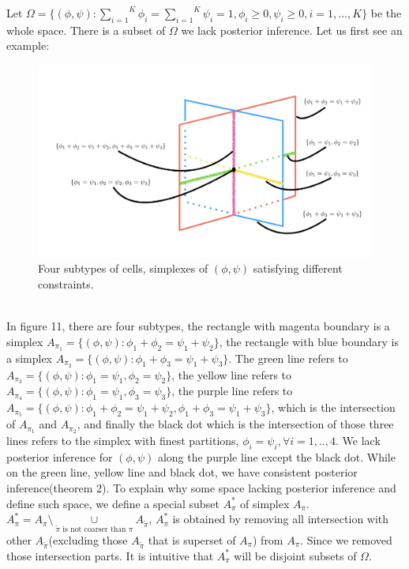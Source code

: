 \documentclass[11pt]{amsart}
\begin{document}
Let $\Omega = \{(\phi, \psi): \overset{K}{\underset{i = 1}\sum}\phi_i = \overset{K}{\underset{i = 1}\sum}\psi_i = 1, \phi_i \geq 0, \psi_i \geq 0 , i = 1,..., K\}$ be the whole space. There is a subset of $\Omega$ we lack posterior inference. Let us first see an example:
\begin{figure}[h]
\includegraphics[scale = 0.5]{overlap.png}
 \caption{Four subtypes of cells,  simplexes of $(\phi,\psi)$ satisfying different constraints.}
  \label{fig:1}
\end{figure}
\hfill\\
In figure 11, there are four subtypes, the rectangle with magenta boundary is a simplex $A_{\pi_1} = \{(\phi,\psi) : \phi_1 + \phi_2 = \psi_1 + \psi_2\}$, the rectangle with blue boundary is a simplex $A_{\pi_2} = \{(\phi,\psi) : \phi_1 + \phi_3 = \psi_1 + \psi_3\}$. The green line refers to $A_{\pi_3} = \{(\phi,\psi) : \phi_1 = \psi_1, \phi_2 = \psi_2\}$, the yellow line refers to $A_{\pi_4} = \{(\phi,\psi) : \phi_1 = \psi_1, \phi_3 = \psi_3\}$, the purple line refers to $A_{\pi_5} = \{(\phi,\psi) : \phi_1 + \phi_2 = \psi_1 + \psi_2, \phi_1 + \phi_3 = \psi_1 + \psi_3\}$, which is the intersection of $A_{\pi_1}$ and $A_{\pi_2}$, and finally the black dot which is the intersection of those three lines refers to the simplex with finest partitions, $\phi_i = \psi_i, \forall i = 1,..,4$. We lack posterior inference for $(\phi,\psi)$ along the purple line except the black dot. While on the green line, yellow line and black dot, we have consistent posterior inference(theorem 2). To explain why some space lacking posterior inference and define such space, we define a special subset $A_\pi^*$ of simplex $A_\pi$. $A_\pi^* = A_\pi\setminus \underset{\tilde{\pi} \text{ is not coarser than } \pi }\cup A_{\tilde{\pi}}$, $A_\pi^*$ is obtained by removing all intersection with other $A_{\tilde{\pi}}$(excluding those $A_{\tilde{\pi}}$ that is superset of $A_\pi$) from $A_\pi$. Since we removed those intersection parts. It is intuitive that $A_\pi^*$ will be disjoint subsets of $\Omega$.\\
\end{document}
